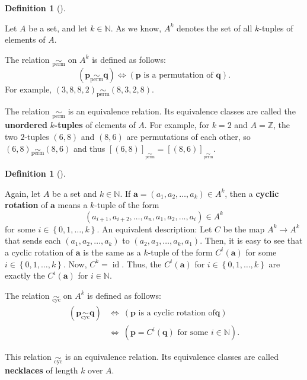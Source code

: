 \documentclass[numbers=enddot,12pt,final,onecolumn,notitlepage]{scrartcl}%
\numberwithin{exer}{subsection}
\theoremstyle{definition}
\newtheorem{defi}[theo]{Definition}
\newenvironment{definition}[1][]
{\begin{defi}[#1]\begin{leftbar}}
{\end{leftbar}\end{defi}}
\begin{document}
\begin{definition}
Let $A$ be a set, and let $k\in\mathbb{N}$. As we know, $A^{k}$ denotes the
set of all $k$-tuples of elements of $A$.

The relation $\underset{\operatorname*{perm}}{\sim}$ on $A^{k}$ is defined as
follows:%
\[
\left(  \mathbf{p}\underset{\operatorname*{perm}}{\sim}\mathbf{q}\right)
\Longleftrightarrow\left(  \mathbf{p}\text{ is a permutation of }%
\mathbf{q}\right)  .
\]
For example, $\left(  3,8,8,2\right)  \underset{\operatorname*{perm}}{\sim
}\left(  8,3,2,8\right)  $.

The relation $\underset{\operatorname*{perm}}{\sim}$ is an equivalence
relation. Its equivalence classes are called the \textbf{unordered }%
$k$\textbf{-tuples} of elements of $A$. For example, for $k=2$ and
$A=\mathbb{Z}$, the two $2$-tuples $\left(  6,8\right)  $ and $\left(
8,6\right)  $ are permutations of each other, so $\left(  6,8\right)
\underset{\operatorname*{perm}}{\sim}\left(  8,6\right)  $ and thus $\left[
\left(  6,8\right)  \right]  _{\underset{\operatorname*{perm}}{\sim}}=\left[
\left(  8,6\right)  \right]  _{\underset{\operatorname*{perm}}{\sim}}$.
\end{definition}

\begin{definition}
Again, let $A$ be a set and $k\in\mathbb{N}$. If $\mathbf{a}=\left(
a_{1},a_{2},\ldots,a_{k}\right)  \in A^{k}$, then a \textbf{cyclic rotation}
of $\mathbf{a}$ means a $k$-tuple of the form%
\[
\left(  a_{i+1},a_{i+2},\ldots,a_{n},a_{1},a_{2},\ldots,a_{i}\right)  \in
A^{k}%
\]
for some $i\in\left\{  0,1,\ldots,k\right\}  $. An equivalent description: Let
$C$ be the map $A^{k}\rightarrow A^{k}$ that sends each $\left(  a_{1}%
,a_{2},\ldots,a_{k}\right)  $ to $\left(  a_{2},a_{3},\ldots,a_{k}%
,a_{1}\right)  $. Then, it is easy to see that a cyclic rotation of
$\mathbf{a}$ is the same as a $k$-tuple of the form $C^{i}\left(
\mathbf{a}\right)  $ for some $i\in\left\{  0,1,\ldots,k\right\}  $. Now,
$C^{k}=\operatorname*{id}$. Thus, the $C^{i}\left(  \mathbf{a}\right)  $ for
$i\in\left\{  0,1,\ldots,k\right\}  $ are exactly the $C^{i}\left(
\mathbf{a}\right)  $ for $i\in\mathbb{N}$.

The relation $\underset{\operatorname*{cyc}}{\sim}$ on $A^{k}$ is defined as
follows:%
\begin{align*}
\left(  \mathbf{p}\underset{\operatorname*{cyc}}{\sim}\mathbf{q}\right)    &
\Longleftrightarrow\ \left(  \mathbf{p}\text{ is a cyclic rotation of
}\mathbf{q}\right)  \\
& \Longleftrightarrow\ \left(  \mathbf{p}=C^{i}\left(  \mathbf{q}\right)
\text{ for some }i\in\mathbb{N}\right)  .
\end{align*}


This relation $\underset{\operatorname*{cyc}}{\sim}$ is an equivalence
relation. Its equivalence classes are called \textbf{necklaces} of length $k$
over $A$.
\end{definition}
\end{document}
